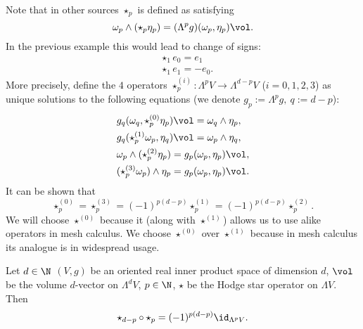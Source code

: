 \begin{remark}
  Note that in other sources $\star_p$ is defined as satisfying
  \begin{equation}
    \omega_p \wedge (\star_p \eta_p) = (\Lambda^p g)(\omega_p, \eta_p) \vol.
  \end{equation}
  In the previous example this would lead to change of signs:
  \begin{subequations}
    \begin{align}
      & \star_1 e_0 = e_1 \\
      & \star_1 e_1 = - e_0.
    \end{align}
  \end{subequations}
  More precisely, define the $4$ operators
  $\star^{(i)}_p \colon \Lambda^p V \to \Lambda^{d - p} V$ ($i = 0, 1, 2, 3$)
  as unique solutions to the following equations
  (we denote $g_p := \Lambda^p g,\ q := d - p$):
  \begin{subequations}
    \begin{align}
      & g_q(\omega_q, \star^{(0)}_p \eta_p) \vol = \omega_q \wedge \eta_p, \\
      & g_q(\star^{(1)}_p \omega_p, \eta_q) \vol = \omega_p \wedge \eta_q, \\
      & \omega_p \wedge (\star^{(2)}_p \eta_p) = g_p(\omega_p, \eta_p) \vol, \\
      & (\star^{(3)}_p \omega_p) \wedge \eta_p = g_p(\omega_p, \eta_p) \vol.
    \end{align}
  \end{subequations}
  It can be shown that
  \begin{equation}
    \star^{(0)}_p
    = \star^{(3)}_p
    = (-1)^{p (d - p)} \star^{(1)}_p
    = (-1)^{p (d - p)} \star^{(2)}_p.
  \end{equation}
  We will choose $\star^{(0)}$ because it (along with $\star^{(1)}$) allows us
  to use alike operators in mesh calculus.
  We choose $\star^{(0)}$ over $\star^{(1)}$ because in mesh calculus its
  analogue is in widespread usage.
\end{remark}
\begin{proposition}
  Let
    $d \in \N$
    $(V, g)$ be an oriented real inner product space of dimension $d$,
    $\vol$ be the volume $d$-vector on $\Lambda^d V$,
    $p \in \N$,
    $\star$ be the Hodge star operator on $\Lambda V$.
  Then
  \begin{equation}
    \star_{d - p} \circ \star_p = (-1)^{p (d - p)} \id_{\Lambda^p V}.
  \end{equation}
\end{proposition}
